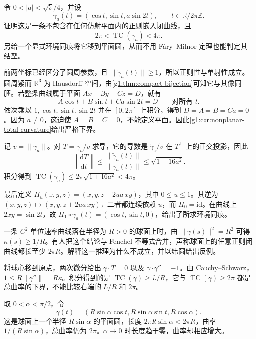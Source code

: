 \begin{exercise}\label{g1:ex:small-wavy-circle}
	令 \(0<|a|<\sqrt3/4\)，并设
	\[
		\gamma_a(t)=(\cos t,\sin t,a\sin2t),\qquad t\in\mathbb R/2\pi\mathbb Z.
	\]
	证明这是一条不包含在任何仿射平面内的正则嵌入闭曲线，且
	\[
		2\pi<\operatorname{TC}(\gamma_a)<4\pi.
	\]
	另给一个显式环境同痕将它移到平面圆，从而不用 Fáry--Milnor 定理也能判定其结型。
\end{exercise}
\begin{solution}
	前两坐标已经区分了圆周参数，且 \(\|\dot\gamma_a(t)\|\ge1\)，所以正则性与单射性成立。圆周紧而 \(\mathbb R^3\) 为 Hausdorff 空间，由\cref{g1:thm:compact-bijection}可知它与其像同胚。若整条曲线属于平面 \(Ax+By+Cz=D\)，就有
	\[
		A\cos t+B\sin t+Ca\sin2t=D\qquad\text{对所有 }t.
	\]
	依次乘以 \(1,\cos t,\sin t,\sin2t\) 并在 \([0,2\pi]\) 上积分，得到 \(D=A=B=Ca=0\)。因为 \(a\ne0\)，这迫使 \(A=B=C=0\)，不能定义平面。因此\cref{g1:cor:nonplanar-total-curvature}给出严格下界。

	记 \(v=\|\dot\gamma_a\|\)。对 \(T=\dot\gamma_a/v\) 求导，它的导数是 \(\ddot\gamma_a/v\) 在 \(T^\perp\) 上的正交投影，因此
	\[
		\left\|\frac{\mathrm{d}T}{\mathrm{d}t}\right\|
		\le\frac{\|\ddot\gamma_a(t)\|}{\|\dot\gamma_a(t)\|}
		\le\sqrt{1+16a^2}.
	\]
	积分得到 \(\operatorname{TC}(\gamma_a)\le2\pi\sqrt{1+16a^2}<4\pi\)。

	最后定义 \(H_u(x,y,z)=(x,y,z-2ua\,xy)\)，其中 \(0\le u\le1\)。其逆为 \((x,y,z)\mapsto(x,y,z+2ua\,xy)\)，二者都连续依赖 \(u\)，而 \(H_0=\mathrm{id}\)。在曲线上 \(2xy=\sin2t\)，故 \(H_1\circ\gamma_a(t)=(\cos t,\sin t,0)\)，给出了所求环境同痕。
\end{solution}

\begin{exercise}\label{g1:ex:spherical-small-circle}
	一条 \(C^2\) 单位速率曲线落在半径为 \(R>0\) 的球面上时，由 \(\|\gamma(s)\|^2=R^2\) 可得 \(\kappa(s)\ge1/R\)。有人把这个结论与 Fenchel 不等式合并，声称球面上的任意正则闭曲线都长至少 \(2\pi R\)。解释这一推理为什么不成立，并以纬圆给出反例。
\end{exercise}
\begin{solution}
	将球心移到原点，两次微分给出 \(\gamma\cdot T=0\) 以及 \(\gamma\cdot\gamma''=-1\)。由 Cauchy--Schwarz，\(1\le R\|\gamma''\|=R\kappa\)。积分得到的是 \(\operatorname{TC}(\gamma)\ge L/R\)，它与 \(\operatorname{TC}(\gamma)\ge2\pi\) 都是总曲率的下界，不能比较右端的 \(L/R\) 和 \(2\pi\)。

	取 \(0<\alpha<\pi/2\)，令
	\[
		\gamma(t)=
		(R\sin\alpha\cos t,R\sin\alpha\sin t,R\cos\alpha).
	\]
	这是球面上一个半径 \(R\sin\alpha\) 的平面圆，长度 \(2\pi R\sin\alpha<2\pi R\)，曲率 \(1/(R\sin\alpha)\)，总曲率仍为 \(2\pi\)。\(\alpha\to0\) 时长度趋于零，曲率却相应增大。
\end{solution}


